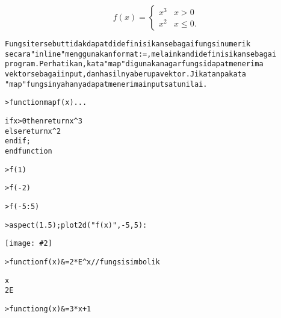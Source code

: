 \documentclass[a4paper,10pt]{article}
\newenvironment{eulernotebook}{}{}
\newenvironment{eulercomment}
{\color{green}\vspace{5pt}%
\parskip=0pt\parsep=0pt\topsep=0pt%
\goodbreak\begin{alltt}\ignorespaces}
{\end{alltt}\vspace{5pt}}
\newenvironment{eulerprompt}
{\color{red}\vspace{5pt plus 20pt}%
\begin{shaded}\parskip=0pt\parsep=0pt\topsep=0pt%
\begin{alltt}\ignorespaces}
{\end{alltt}\end{shaded}\vspace{5pt}}
\newenvironment{eulerudf}
{\color{blue}\parskip=0pt\parsep=0pt\topsep=0pt%
\begin{alltt}\ignorespaces}
{\end{alltt}\vspace{5pt}}
\newenvironment{euleroutput}
{\color{black}\vspace{5pt}%
\parskip=0pt\parsep=0pt\topsep=0pt%
\begin{alltt}\ignorespaces}
{\end{alltt}\vspace{5pt}}
\newlength{\eulerline}
\newcommand\eulerimg[2]{%
\begin{center}\texttt{[image: \#2]}\end{center}}
\newenvironment{eulerformula}
{\color{green}\belowdisplayskip=0pt\belowdisplayshortskip=0pt%
\abovedisplayskip=0pt\abovedisplayshortskip=0pt}{}
\begin{document}
\begin{eulernotebook}
\begin{eulercomment}
\end{eulercomment}
\begin{eulerformula}
\[
f(x) = \begin{cases} x^3 & x>0 \\ x^2 & x\le 0. \end{cases}
\]
\end{eulerformula}
\begin{eulercomment}
Fungsi tersebut tidak dapat didefinisikan sebagai fungsi numerik
secara "inline" menggunakan format :=, melainkan didefinisikan sebagai
program. Perhatikan, kata "map" digunakan agar fungsi dapat menerima
vektor sebagai input, dan hasilnya berupa vektor. Jika tanpa kata
"map" fungsinya hanya dapat menerima input satu nilai.
\end{eulercomment}
\begin{eulerprompt}
>function map f(x) ...
\end{eulerprompt}
\begin{eulerudf}
    if x>0 then return x^3
    else return x^2
    endif;
  endfunction
\end{eulerudf}
\begin{eulerprompt}
>f(1)
\end{eulerprompt}
\begin{euleroutput}
  1
\end{euleroutput}
\begin{eulerprompt}
>f(-2)
\end{eulerprompt}
\begin{euleroutput}
  4
\end{euleroutput}
\begin{eulerprompt}
>f(-5:5)
\end{eulerprompt}
\begin{euleroutput}
  [25,  16,  9,  4,  1,  0,  1,  8,  27,  64,  125]
\end{euleroutput}
\begin{eulerprompt}
>aspect(1.5); plot2d("f(x)",-5,5):
\end{eulerprompt}
\eulerimg{17}{images/Ardan Andhirta_22305141045_EMT4Kalkulus-1-001.png}
\begin{eulerprompt}
>function f(x) &= 2*E^x // fungsi simbolik
\end{eulerprompt}
\begin{euleroutput}
  
                                      x
                                   2 E
  
\end{euleroutput}
\begin{eulerprompt}
>function g(x) &= 3*x+1
\end{eulerprompt}
\begin{euleroutput}
  

\end{euleroutput}
\end{eulernotebook}
\end{document}
